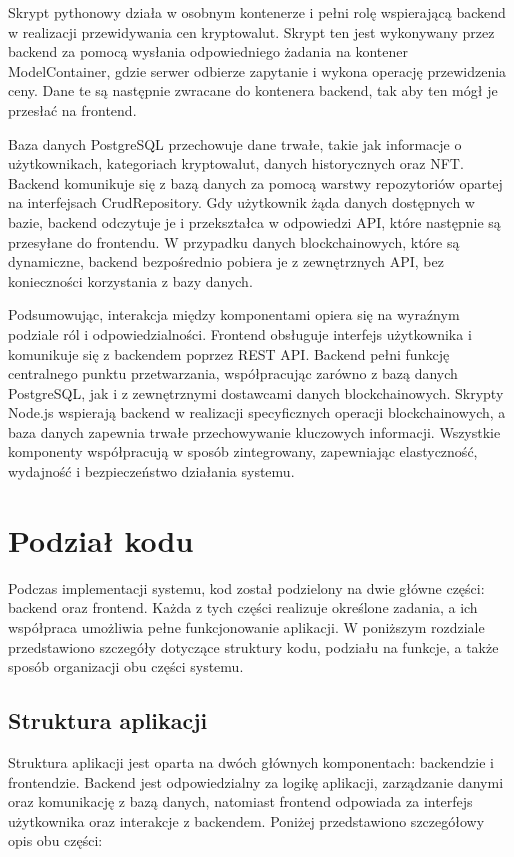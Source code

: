 Skrypt pythonowy działa w osobnym kontenerze i pełni rolę wspierającą backend w realizacji przewidywania cen kryptowalut. Skrypt ten jest wykonywany przez backend za pomocą wysłania odpowiedniego żadania na kontener ModelContainer, gdzie serwer odbierze zapytanie i wykona operację przewidzenia ceny. Dane te są następnie zwracane do kontenera backend, tak aby ten mógł je przesłać na frontend.

Baza danych PostgreSQL przechowuje dane trwałe, takie jak informacje o użytkownikach, kategoriach kryptowalut, danych historycznych oraz NFT. Backend komunikuje się z bazą danych za pomocą warstwy repozytoriów opartej na interfejsach CrudRepository. Gdy użytkownik żąda danych dostępnych w bazie, backend odczytuje je i przekształca w odpowiedzi API, które następnie są przesyłane do frontendu. W przypadku danych blockchainowych, które są dynamiczne, backend bezpośrednio pobiera je z zewnętrznych API, bez konieczności korzystania z bazy danych.

Podsumowując, interakcja między komponentami opiera się na wyraźnym podziale ról i odpowiedzialności. Frontend obsługuje interfejs użytkownika i komunikuje się z backendem poprzez REST API. Backend pełni funkcję centralnego punktu przetwarzania, współpracując zarówno z bazą danych PostgreSQL, jak i z zewnętrznymi dostawcami danych blockchainowych. Skrypty Node.js wspierają backend w realizacji specyficznych operacji blockchainowych, a baza danych zapewnia trwałe przechowywanie kluczowych informacji. Wszystkie komponenty współpracują w sposób zintegrowany, zapewniając elastyczność, wydajność i bezpieczeństwo działania systemu.

\section{Podział kodu}

Podczas implementacji systemu, kod został podzielony na dwie główne części: backend oraz frontend. Każda z tych części realizuje określone zadania, a ich współpraca umożliwia pełne funkcjonowanie aplikacji. W poniższym rozdziale przedstawiono szczegóły dotyczące struktury kodu, podziału na funkcje, a także sposób organizacji obu części systemu.

\subsection{Struktura aplikacji}

Struktura aplikacji jest oparta na dwóch głównych komponentach: backendzie i frontendzie. Backend jest odpowiedzialny za logikę aplikacji, zarządzanie danymi oraz komunikację z bazą danych, natomiast frontend odpowiada za interfejs użytkownika oraz interakcje z backendem. Poniżej przedstawiono szczegółowy opis obu części:

